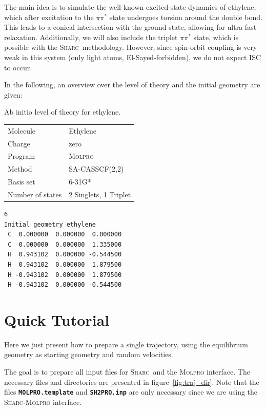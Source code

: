 \documentclass[a4paper,11pt,DIV=15,openany]{scrbook}
\newcommand{\sharc}{\textsc{Sharc}}
\newcommand{\ttt}[1]{\textbf{\texttt{#1}}}
\newenvironment{example}{
  \vspace{0mm}
  \definecolor{shadecolor}{HTML}{E4F4FF}
  \begin{shaded}
}{
  \end{shaded}
}
\begin{document}
The main idea is to simulate the well-known excited-state dynamics of ethylene, which after excitation to the $\pi\pi^*$ state undergoes torsion around the double bond. This leads to a conical intersection with the ground state, allowing for ultra-fast relaxation. Additionally, we will also include the triplet $\pi\pi^*$ state, which is possible with the \sharc\ methodology. However, since spin-orbit coupling is very weak in this system (only light atoms, El-Sayed-forbidden), we do not expect ISC to occur. 

In the following, an overview over the level of theory and the initial geometry are given:

\begin{example}
\begin{minipage}{0.45\textwidth}
  \centering
  Ab initio level of theory for ethylene.
  \begin{tabular}{ll}
    \toprule
    Molecule            &Ethylene\\
    Charge              &zero\\
    Program             &\textsc{Molpro}\\
    Method              &SA-CASSCF(2,2)\\
    Basis set           &6-31G*\\
    Number of states    &2 Singlets, 1 Triplet\\
    \bottomrule
  \end{tabular}
\end{minipage}
\hfill
\begin{minipage}{0.45\textwidth}
  \begin{verbatim}
6
Initial geometry ethylene
 C  0.000000  0.000000  0.000000
 C  0.000000  0.000000  1.335000
 H  0.943102  0.000000 -0.544500
 H  0.943102  0.000000  1.879500
 H -0.943102  0.000000  1.879500
 H -0.943102  0.000000 -0.544500
  \end{verbatim}
\end{minipage}
\end{example}


\chapter{Quick Tutorial}

Here we just present how to prepare a single trajectory, using the equilibrium geometry as starting geometry and random velocities. 

The goal is to prepare all input files for \sharc\ and the \textsc{Molpro} interface. The necessary files and directories are presented in figure~\ref{fig:traj_dir}. Note that the files \ttt{MOLPRO.template} and \ttt{SH2PRO.inp} are only necessary since we are using the \sharc-\textsc{Molpro} interface.
\end{document}

